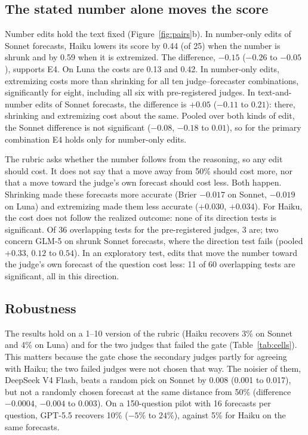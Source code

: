 \documentclass[letterpaper]{article} %
\begin{document}
\subsection{The stated number alone moves the score}\label{sec:edits}
Number edits hold the text fixed (Figure~\ref{fig:pairs}b). In number-only edits of Sonnet forecasts, Haiku lowers its score by 0.44 (of 25) when the number is shrunk and by 0.59 when it is extremized. The difference, $-0.15$ ($-0.26$ to $-0.05$), supports E4. On Luna the costs are 0.13 and 0.42. In number-only edits, extremizing costs more than shrinking for all ten judge--forecaster combinations, significantly for eight, including all six with pre-registered judges. In text-and-number edits of Sonnet forecasts, the difference is $+0.05$ ($-0.11$ to $0.21$): there, shrinking and extremizing cost about the same. Pooled over both kinds of edit, the Sonnet difference is not significant ($-0.08$, $-0.18$ to $0.01$), so for the primary combination E4 holds only for number-only edits.

The rubric asks whether the number follows from the reasoning, so any edit should cost. It does not say that a move away from 50\% should cost more, nor that a move toward the judge's own forecast should cost less. Both happen. Shrinking made these forecasts more accurate (Brier $-0.017$ on Sonnet, $-0.019$ on Luna) and extremizing made them less accurate ($+0.030$, $+0.034$). For Haiku, the cost does not follow the realized outcome: none of its direction tests is significant. Of 36 overlapping tests for the pre-registered judges, 3 are; two concern GLM-5 on shrunk Sonnet forecasts, where the direction test fails (pooled $+0.33$, $0.12$ to $0.54$). In an exploratory test, edits that move the number toward the judge's own forecast of the question cost less: 11 of 60 overlapping tests are significant, all in this direction.

\subsection{Robustness}
The results hold on a 1--10 version of the rubric (Haiku recovers 3\% on Sonnet and 4\% on Luna) and for the two judges that failed the gate (Table~\ref{tab:cells}). This matters because the gate chose the secondary judges partly for agreeing with Haiku; the two failed judges were not chosen that way. The noisier of them, DeepSeek V4 Flash, beats a random pick on Sonnet by 0.008 (0.001 to 0.017), but not a randomly chosen forecast at the same distance from 50\% (difference $-0.0004$, $-0.004$ to $0.003$). On a 150-question pilot with 16 forecasts per question, GPT-5.5 recovers 10\% ($-5\%$ to $24\%$), against 5\% for Haiku on the same forecasts.
\end{document}
